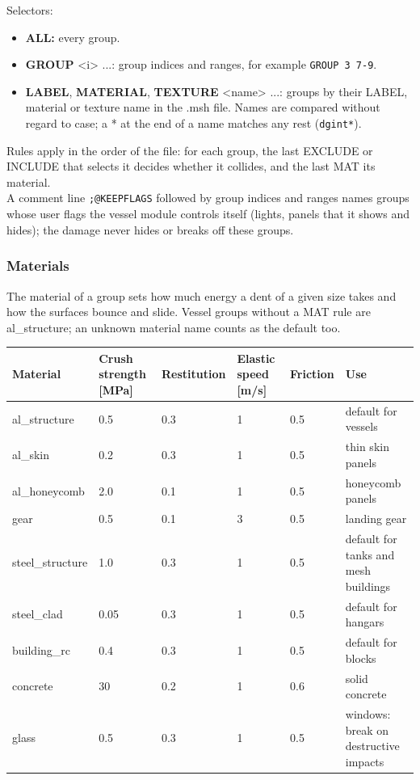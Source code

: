 \documentclass[Orbiter Developer Manual.tex]{subfiles}
\begin{document}
\begin{sloppypar}
\noindent
Selectors:

\begin{itemize}
\item \textbf{ALL:} every group.
\item \textbf{GROUP} <i> ...: group indices and ranges, for example \texttt{GROUP 3 7-9}.
\item \textbf{LABEL}, \textbf{MATERIAL}, \textbf{TEXTURE} <name> ...: groups by their LABEL, material or texture name in the .msh file. Names are compared without regard to case; a * at the end of a name matches any rest (\texttt{dgint*}).
\end{itemize}

\noindent
Rules apply in the order of the file: for each group, the last EXCLUDE or INCLUDE that selects it decides whether it collides, and the last MAT its material.\\
A comment line \texttt{;@KEEPFLAGS} followed by group indices and ranges names groups whose user flags the vessel module controls itself (lights, panels that it shows and hides); the damage never hides or breaks off these groups.


\subsubsection{Materials}
The material of a group sets how much energy a dent of a given size takes and how the surfaces bounce and slide. Vessel groups without a MAT rule are al\_structure; an unknown material name counts as the default too.

	\begin{longtable}{ |p{}|p{}|p{}|p{}|p{}|p{}| }
	\hline\rule{0pt}{2ex}
	\textbf{Material} & \textbf{Crush strength [MPa]} & \textbf{Restitution} & \textbf{Elastic speed [m/s]} & \textbf{Friction} & \textbf{Use}\\
	\hline\rule{0pt}{2ex}
	al\_structure & 0.5 & 0.3 & 1 & 0.5 & default for vessels\\
	\hline\rule{0pt}{2ex}
	al\_skin & 0.2 & 0.3 & 1 & 0.5 & thin skin panels\\
	\hline\rule{0pt}{2ex}
	al\_honeycomb & 2.0 & 0.1 & 1 & 0.5 & honeycomb panels\\
	\hline\rule{0pt}{2ex}
	gear & 0.5 & 0.1 & 3 & 0.5 & landing gear\\
	\hline\rule{0pt}{2ex}
	steel\_structure & 1.0 & 0.3 & 1 & 0.5 & default for tanks and mesh buildings\\
	\hline\rule{0pt}{2ex}
	steel\_clad & 0.05 & 0.3 & 1 & 0.5 & default for hangars\\
	\hline\rule{0pt}{2ex}
	building\_rc & 0.4 & 0.3 & 1 & 0.5 & default for blocks\\
	\hline\rule{0pt}{2ex}
	concrete & 30 & 0.2 & 1 & 0.6 & solid concrete\\
	\hline\rule{0pt}{2ex}
	glass & 0.5 & 0.3 & 1 & 0.5 & windows: break on destructive impacts\\
	\hline
	\end{longtable}


\end{sloppypar}
\end{document}
